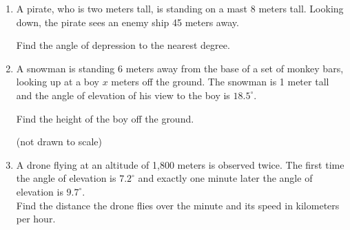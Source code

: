 \documentclass[12pt, twoside]{article}
\begin{document}
\begin{enumerate}
\newpage
\item A pirate, who is two meters tall, is standing on a mast 8 meters tall. Looking down, the pirate sees an enemy ship 45 meters away.

  Find the angle of depression to the nearest degree.
  \begin{center}
    \end{center} \vspace{4cm}
    
\item A snowman is standing 6 meters away from the base of a set of monkey bars, looking up at a boy $x$ meters off the ground. The snowman is 1 meter tall and the angle of elevation of his view to the boy is $18.5^\circ$.

    Find the height of the boy off the ground.
    
      \hfill (not drawn to scale)
      \begin{flushright}
        \end{flushright}

\newpage
\item A drone flying at an altitude of 1,800 meters is observed twice. The first time the angle of elevation is $7.2^\circ$ and exactly one minute later the angle of elevation is $9.7^\circ$. \\[0.25cm]
Find the distance the drone flies over the minute and its speed in kilometers per hour.


\end{enumerate}
\end{document}
